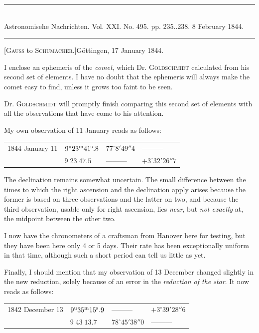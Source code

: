 \clearpage
\hypertarget{native-469-letter}{}
\begin{center}
\rule{0.55\linewidth}{0.4pt}\\[2pt]
Astronomisehe Nachrichten. Vol. XXI. No. 495. pp. 235..238. 8 February 1844.\\[2pt]
\rule{0.55\linewidth}{0.4pt}
\end{center}

\begin{center}[\textsc{Gauss} to \textsc{Schumacher.}]\quad Göttingen, 17 January 1844.\end{center}

I enclose an ephemeris of the \emph{comet}, which Dr. \textsc{Goldschmidt} calculated from his second set of elements. I have no doubt that the ephemeris will always make the comet easy to find, unless it grows too faint to be seen.

Dr. \textsc{Goldschmidt} will promptly finish comparing this second set of elements with all the observations that have come to his attention.

My own observation of 11 January reads as follows:
\begin{center}
\begin{tabular}{l|l|l|l}
1844 January 11 & $9^{\rm u}23^{\rm m}41^{\rm s}.8$ & $77^\circ8'49''4$ & ---\quad ---\quad --- \\
 & $9\;23\;47.5$ & ---\quad ---\quad --- & $+3^\circ32'26''7$ \\
\end{tabular}
\end{center}

The declination remains somewhat uncertain. The small difference between the times to which the right ascension and the declination apply arises because the former is based on three observations and the latter on two, and because the third observation, usable only for right ascension, lies \emph{near}, but \emph{not exactly} at, the midpoint between the other two.

I now have the chronometers of a craftsman from Hanover here for testing, but they have been here only 4 or 5 days. Their rate has been exceptionally uniform in that time, although such a short period can tell us little as yet.

Finally, I should mention that my observation of 13 December changed slightly in the new reduction, solely because of an error in the \emph{reduction of the star}. It now reads as follows:
\begin{center}
\begin{tabular}{l|l|l|l}
1842 December 13 & $9^{\rm u}35^{\rm m}15^{\rm s}.9$ & ---\quad ---\quad --- & $+3^\circ39'28''6$ \\
 & $9\;43\;13.7$ & $78^\circ45'38''0$ & ---\quad ---\quad --- \\
\end{tabular}
\end{center}

